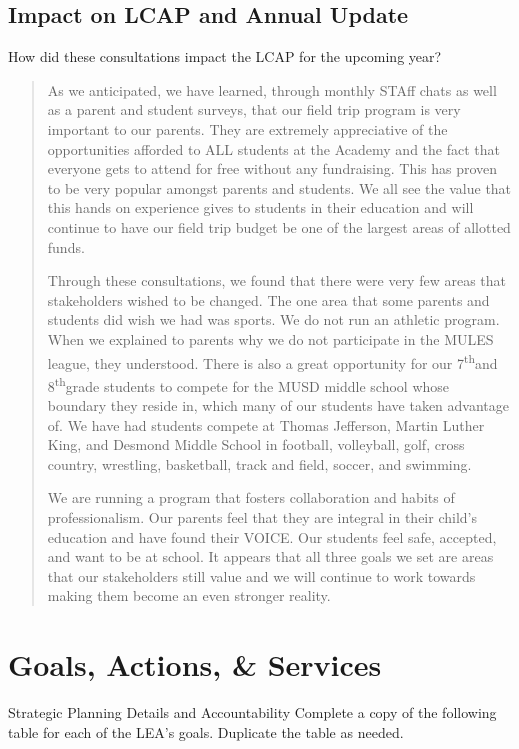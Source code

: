\documentclass{article}
\newcommand{\supth}{\textsuperscript{th}}
\newcounter{goal}[section] %
\begin{document}
\subsection{Impact on LCAP and Annual Update}
How did these consultations impact the LCAP for the upcoming year?
\begin{quotation}
	As we anticipated, we have learned, through monthly STAff chats as well as a parent and student surveys, that our field trip program is very important to our parents. They are extremely appreciative of the opportunities afforded to ALL students at the Academy and the fact that everyone gets to attend for free without any fundraising. This has proven to be very popular amongst parents and students. We all see the value that this hands on experience gives to students in their education and will continue to have our field trip budget be one of the largest areas of allotted funds.

	Through these consultations, we found that there were very few areas that stakeholders wished to be changed. The one area that some parents and students did wish we had was sports. We do not run an athletic program. When we explained to parents why we do not participate in the MULES league, they understood. There is also a great opportunity for our 7\supth and 8\supth grade students to compete for the MUSD middle school whose boundary they reside in, which many of our students have taken advantage of. We have had students compete at Thomas Jefferson, Martin Luther King, and Desmond Middle School in football, volleyball, golf, cross country, wrestling, basketball, track and field, soccer, and swimming.

	We are running a program that fosters collaboration and habits of professionalism. Our parents feel that they are integral in their child's education and have found their VOICE. Our students feel safe, accepted, and want to be at school. It appears that all three goals we set are areas that our stakeholders still value and we will continue to work towards making them become an even stronger reality.
\end{quotation}

\section{Goals, Actions, \& Services}
Strategic Planning Details and Accountability\newline
Complete a copy of the following table for each of the LEA's goals. Duplicate the table as needed.
\end{document}
